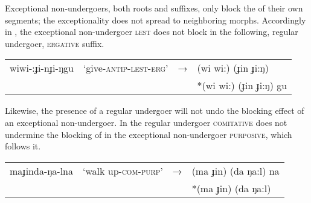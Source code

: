 \documentclass[output=paper,
modfonts
]{LSP/langsci}
\begin{document}
Exceptional non-undergoers, both roots and suffixes, only block the  of their own segments; the exceptionality does not spread to neighboring morphs. Accordingly in , the exceptional non-undergoer \textsc{lest} does not block  in the following, regular undergoer, \textsc{ergative} suffix. 

\ea \label{ex:round:14}
\begin{tabular}[t]{@{}llll}
wiwi-:ɟi-nɟi-ŋgu &`give-\textsc{antip-lest-erg}' & → & (wi wi:) (ɟin ɟi:ŋ)\\
&&& *(wi wi:) (ɟin ɟi:ŋ) gu  \\
\end{tabular}
\z 

\noindent Likewise, the presence of a regular undergoer will not undo the blocking effect of an exceptional non-undergoer. In  the regular undergoer \textsc{comitative} does not undermine the blocking of  in the exceptional non-undergoer \textsc{purposive}, which follows it.

\ea \label{ex:round:15}
\begin{tabular}[t]{@{}llll}
maɟinda-ŋa-lna & `walk up-\textsc{com-purp}'& → & (ma ɟin) (da ŋa:l) na\\
&&& *(ma ɟin) (da ŋa:l) \\

\end{tabular}
\z
\end{document}
